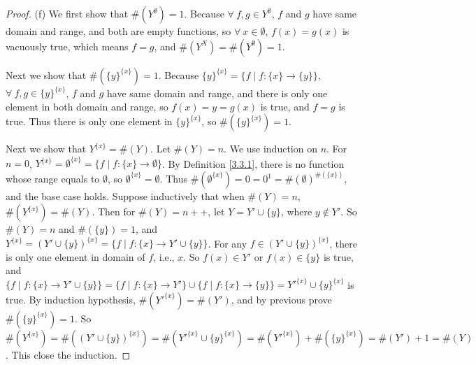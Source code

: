 \begin{proof}{(f)}
We first show that \(\#(Y^{\emptyset}) = 1\).
Because \(\forall\ f, g \in Y^{\emptyset}\), \(f\) and \(g\) have same domain and range, and both are empty functions, so \(\forall\ x \in \emptyset\), \(f(x) = g(x)\) is vacuously true, which means \(f = g\), and \(\#(Y^X) = \#(Y^{\emptyset}) = 1\).

Next we show that \(\#(\{y\}^{\{x\}}) = 1\).
Because \(\{y\}^{\{x\}} = \{f \mid f : \{x\} \to \{y\}\}\), \(\forall\ f, g \in \{y\}^{\{x\}}\), \(f\) and \(g\) have same domain and range, and there is only one element in both domain and range, so \(f(x) = y = g(x)\) is true, and \(f = g\) is true.
Thus there is only one element in \(\{y\}^{\{x\}}\), so \(\#(\{y\}^{\{x\}}) = 1\).

Next we show that \(Y^{\{x\}} = \#(Y)\).
Let \(\#(Y) = n\).
We use induction on \(n\).
For \(n = 0\), \(Y^{\{x\}} = \emptyset^{\{x\}} = \{f \mid f : \{x\} \to \emptyset\}\).
By Definition \ref{3.3.1}, there is no function whose range equals to \(\emptyset\), so \(\emptyset^{\{x\}} = \emptyset\).
Thus \(\#(\emptyset^{\{x\}}) = 0 = 0^1 = \#(\emptyset)^{\#(\{x\})}\), and the base case holds.
Suppose inductively that when \(\#(Y) = n\), \(\#(Y^{\{x\}}) = \#(Y)\).
Then for \(\#(Y) = n++\), let \(Y = Y' \cup \{y\}\), where \(y \notin Y'\).
So \(\#(Y) = n\) and \(\#(\{y\}) = 1\), and \(Y^{\{x\}} = (Y' \cup \{y\})^{\{x\}} = \{f \mid f : \{x\} \to Y' \cup \{y\}\}\).
For any \(f \in (Y' \cup \{y\})^{\{x\}}\), there is only one element in domain of \(f\), i.e., \(x\).
So \(f(x) \in Y'\) or \(f(x) \in \{y\}\) is true, and \(\{f \mid f : \{x\} \to Y' \cup \{y\}\} = \{f \mid f : \{x\} \to Y'\} \cup \{f \mid f : \{x\} \to \{y\}\} = Y'^{\{x\}} \cup \{y\}^{\{x\}}\) is true.
By induction hypothesis, \(\#(Y'^{\{x\}}) = \#(Y')\), and by previous prove \(\#(\{y\}^{\{x\}}) = 1\).
So \(\#(Y^{\{x\}}) = \#((Y' \cup \{y\})^{\{x\}}) = \#(Y'^{\{x\}} \cup \{y\}^{\{x\}}) = \#(Y'^{\{x\}}) + \#(\{y\}^{\{x\}}) = \#(Y') + 1 = \#(Y)\).
This close the induction.


\end{proof}
